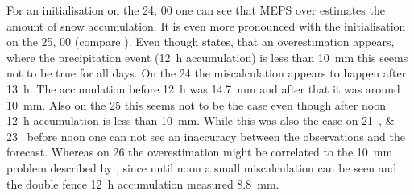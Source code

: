 For an initialisation on the \SI{24}{\dec}, \SI{00}{\UTC} one can see that  MEPS over estimates the amount of snow accumulation. It is even more pronounced with the initialisation on the \SI{25}{\dec}, \SI{00}{\UTC} (compare ). Even though \cite{muller_arome-metcoop:_2017} states, that an overestimation appears, where the precipitation event (\SI{12}{\hour} accumulation) is less than \SI{10}{\mm} this seems not to be true for all days. On the \SI{24}{\dec} the miscalculation appears to happen after \SI{13}{\hour}. The accumulation before \SI{12}{\hour} was \SI{14.7}{\mm} and after that it was around \SI{10}{\mm}. Also on the \SI{25}{\dec} this seems not to be the case even though after noon \SI{12}{\hour} accumulation is less than \SI{10}{\mm}. While this was also the case on \SIlist{21;23}{\dec} before noon one can not see an inaccuracy between the observations and the forecast. Whereas on \SI{26}{\dec} the overestimation might be correlated to the \SI{10}{\mm} problem described by \cite{muller_arome-metcoop:_2017}, since until noon a small miscalculation can be seen and the double fence \SI{12}{\hour} accumulation measured \SI{8.8}{\mm}. 
%


